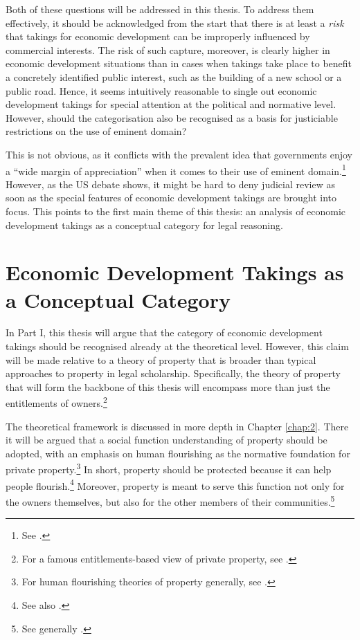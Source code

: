 Both of these questions will be addressed in this thesis. To address them effectively, it should be acknowledged from the start that there is at least a {\it risk} that takings for economic development can be improperly influenced by commercial interests. The risk of such capture, moreover, is clearly higher in economic development situations than in cases when takings take place to benefit a concretely identified public interest, such as the building of a new school or a public road. Hence, it seems intuitively reasonable to single out economic development takings for special attention at the political and normative level. However, should the categorisation also be recognised as a basis for justiciable restrictions on the use of eminent domain?

This is not obvious, as it conflicts with the prevalent idea that governments enjoy a ``wide margin of appreciation'' when it comes to their use of eminent domain.\footnote{See \cite[54]{james86}.} However, as the US debate shows, it might be hard to deny judicial review as soon as the special features of economic development takings are brought into focus. This points to the first main theme of this thesis: an analysis of economic development takings as a conceptual category for legal reasoning.

\section{Economic Development Takings as a Conceptual Category}\label{sec:1:1}

In Part I, this thesis will argue that the category of economic development takings should be recognised already at the theoretical level. However, this claim will be made relative to a theory of property that is broader than typical approaches to property in legal scholarship. Specifically, the theory of property that will form the backbone of this thesis will encompass more than just the entitlements of owners.\footnote{For a famous entitlements-based view of private property, see \cite{calabresi72}.}

The theoretical framework is discussed in more depth in Chapter \ref{chap:2}. There it will be argued that a social function understanding of property should be adopted, with an emphasis on human flourishing as the normative foundation for private property.\footnote{For human flourishing theories of property generally, see \cite[Chapter 5]{alexander10}.} In short, property should be protected because it can help people flourish.\footnote{See also \cite[1089]{crawford11}.} Moreover, property is meant to serve this function not only for the owners themselves, but also for the other members of their communities.\footnote{See generally \cite{gray94,alexander09d,alexander14}.}

